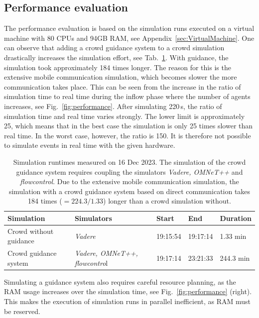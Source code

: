 \subsection{Performance evaluation}
\label{sec:performanceevaluation}
The performance evaluation is based on the simulation runs executed on a virtual machine with 80 CPUs and 94GB RAM, see Appendix~\ref{sec:VirtualMachine}. One can observe that adding a crowd guidance system to a crowd simulation drastically increases the simulation effort, see Tab.~\ref{tab:runtimes}. With guidance, the simulation took approximately 184 times longer. The reason for this is the extensive mobile communication simulation, which becomes slower the more communication takes place. This can be seen from the increase in the ratio of simulation time to real time during the inflow phase where the number of agents increases, see Fig.~\ref{fig:performance}. 
After simulating 220\,s, the ratio of simulation time and real time varies strongly. The lower limit is approximately 25, which means that in the best case the simulation is only 25 times slower than real time. In the worst case, however, the ratio is 150. It is therefore not possible to simulate events in real time with the given hardware.

\begin{table}[hbt!]
\centering
\begin{tabular}{|p{3cm}|p{3.7cm}|p{1.3cm}|p{1.3cm}|p{1.9cm}|}
\hline 
Simulation & Simulators & Start & End & Duration\\ 
\hline
Crowd without guidance & \textit{Vadere} & 19:15:54 & 19:17:14 & 1.33 min \\ \hline
Crowd guidance system & \textit{Vadere, OMNeT++, flowcontro}l & 19:17:14 & 23:21:33 & 244.3 min \\
\hline 
\end{tabular} 
\caption[Simulation runtimes]{Simulation runtimes measured on 16 Dec 2023. The simulation of the crowd guidance system requires coupling the simulators \textit{Vadere, OMNeT++} and \textit{flowcontrol}. Due to the extensive mobile communication simulation, the simulation with a crowd guidance system based on direct communication takes 184 times ($=224.3/1.33$) longer than a crowd simulation without.}
\label{tab:runtimes}
\end{table}


Simulating  a guidance system also requires careful resource planning, as the RAM usage increases over the simulation time, see Fig.~\ref{fig:performance} (right). This makes the execution of simulation runs in parallel inefficient, as RAM must be reserved.


